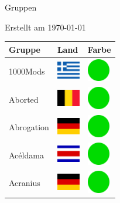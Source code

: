 \documentclass[12pt, a4paper, twoside]{report}
\begin{document}
	
	\begin{center}
		\vspace{1cm}
		{\Large Gruppen\par}
		
		{\large Erstellt am \today\par}
	\end{center}
	
	\begin{center}
		\begin{longtable}{|p{5cm}|p{2cm}|p{2cm}|} 
			
			\hline
			\rowcolor{lightgray} Gruppe & Land & Farbe \\ \hline
			\endhead
			1000Mods & \includegraphics[width=1cm]{4x3/gr} & \includegraphics[width=1cm]{likes/y} \\ \hline
			Aborted & \includegraphics[width=1cm]{4x3/be} & \includegraphics[width=1cm]{likes/y} \\ \hline
			Abrogation & \includegraphics[width=1cm]{4x3/de} & \includegraphics[width=1cm]{likes/y} \\ \hline
			Acéldama & \includegraphics[width=1cm]{4x3/cr} & \includegraphics[width=1cm]{likes/y} \\ \hline
			Acranius & \includegraphics[width=1cm]{4x3/de} & \includegraphics[width=1cm]{likes/y} \\ \hline

\end{longtable}
\end{center}
\end{document}

